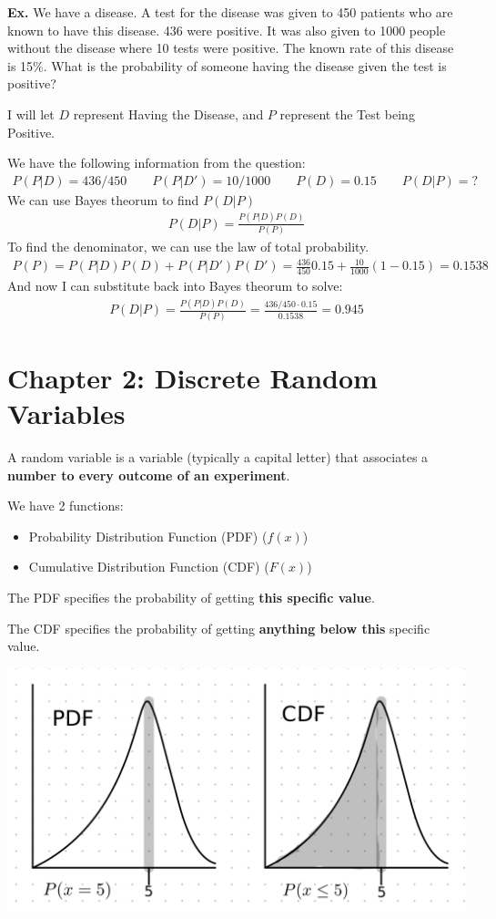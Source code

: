 \documentclass[12pt,letterpaper]{article} \usepackage{amsmath} \usepackage{graphicx} \usepackage[margin=1in]{geometry} \usepackage{longtable}  \usepackage{amssymb}
\begin{document}
	\begin{mdframed}
		\textbf{Ex. }We have a disease. A test for the disease was given to 450 patients who are known to have this disease. 436 were positive. It was also given to 1000 people without the disease where 10 tests were positive. The known rate of this disease is 15\%. What is the probability of someone having the disease given the test is positive?
		
		I will let $D$ represent Having the Disease, and $P$ represent the Test being Positive.
		
		We have the following information from the question:
		\begin{align*}
			P(P|D) = 436/450 \qquad P(P|D\prime ) = 10/1000 \qquad P(D) = 0.15 \qquad P(D| P) = ?
		\end{align*}
		We can use Bayes theorum to find $P(D|P)$
		\begin{align*}
			P(D|P) = \frac{P(P|D)P(D)}{P(P)}
		\end{align*}
		To find the denominator, we can use the law of total probability. 
		\begin{align*}
			P(P) = P(P|D)P(D) + P(P|D\prime)P(D\prime) = \frac{436}{450}0.15 + \frac{10}{1000}(1-0.15) = 0.1538
		\end{align*}
		And now I can substitute back into Bayes theorum to solve:
		\begin{align*}
			P(D|P) = \frac{P(P|D)P(D)}{P(P)} = \frac{436/450 \cdot 0.15}{0.1538} = 0.945
		\end{align*}
	\end{mdframed}


	
	\section{Chapter 2: Discrete Random Variables}
	A random variable is a variable (typically a capital letter) that associates a \textbf{number to every outcome of an experiment}. 
	
	We have 2 functions:
	\begin{itemize}
		\item Probability Distribution Function (PDF) ($f(x)$)
		\item Cumulative Distribution Function (CDF) ($F(x)$)
	\end{itemize}

	The PDF specifies the probability of getting\textbf{ this specific value}. 
	
	The CDF specifies the probability of getting \textbf{anything below this} specific value. 
	\begin{center}
		\includegraphics[width=0.7\linewidth]{pdf-vs-cdf}
	\end{center}
\end{document}
